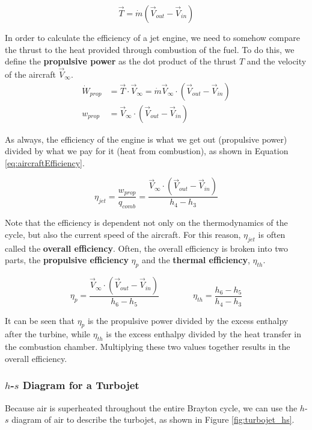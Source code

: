 \begin{equation}\label{eq:thrust}
  \vec{T} = \dot{m} \left(\vec{V}_{out} - \vec{V}_{in}\right)
\end{equation}

In order to calculate the efficiency of a jet engine, we need to somehow compare the thrust to the heat provided through combustion of the fuel.  To do this, we define the {\bf propulsive power} as the dot product of the thrust $T$ and the velocity of the aircraft $\vec{V}_{\infty}$.
\begin{align}
  \nonumber \dot{W}_{prop} &= \vec{T} \cdot \vec{V}_{\infty} = \dot{m} \vec{V}_{\infty}\cdot\left(\vec{V}_{out} - \vec{V}_{in}\right)\\
  \label{eq:propulsivePower} w_{prop} &= \vec{V}_{\infty} \cdot \left(\vec{V}_{out} - \vec{V}_{in}\right)
\end{align}

As always, the efficiency of the engine is what we get out (propulsive power) divided by what we pay for it (heat from combustion), as shown in Equation \ref{eq:aircraftEfficiency}.

\begin{equation}\label{eq:aircraftEfficiency}
  \eta_{jet} = \frac{w_{prop}}{q_{comb}} = \frac{\vec{V}_{\infty} \cdot \left(\vec{V}_{out} - \vec{V}_{in}\right)}{h_4-h_3}
\end{equation}

Note that the efficiency is dependent not only on the thermodynamics of the cycle, but also the current speed of the aircraft.  For this reason, $\eta_{jet}$ is often called the {\bf overall efficiency}.  Often, the overall efficiency is broken into two parts, the {\bf propulsive efficiency} $\eta_{p}$ and the {\bf thermal efficiency}, $\eta_{th}$.

\begin{equation*}
  \eta_p = \frac{\vec{V}_{\infty} \cdot \left(\vec{V}_{out} - \vec{V}_{in}\right)}{h_6 - h_5} \qquad \qquad \eta_{th} = \frac{h_6 - h_5}{h_4 - h_3}
\end{equation*}

It can be seen that $\eta_p$ is the propulsive power divided by the excess enthalpy after the turbine, while $\eta_{th}$ is the excess enthalpy divided by the heat transfer in the combustion chamber.  Multiplying these two values together results in the overall efficiency.

\subsubsection{$h$-$s$ Diagram for a Turbojet}
Because air is superheated throughout the entire Brayton cycle, we can use the $h$-$s$ diagram of air to describe the turbojet, as shown in Figure \ref{fig:turbojet_hs}.

